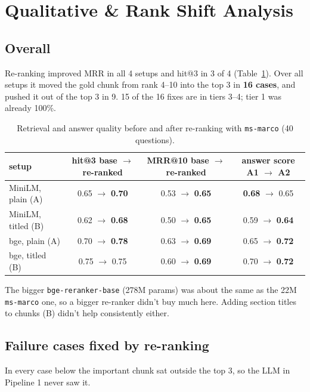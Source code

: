 \documentclass[10pt,a4paper]{article}
\begin{document}
\section{Qualitative \& Rank Shift Analysis}

\subsection{Overall}
Re-ranking improved MRR in all 4 setups and hit@3 in 3 of 4 (Table~\ref{tab:ret}). Over all setups it moved the gold chunk from rank 4--10 into the top 3 in \textbf{16 cases}, and pushed it out of the top 3 in 9. 15 of the 16 fixes are in tiers 3--4; tier 1 was already 100\%.

\begin{table}[H]
\centering\small
{}
\begin{tabular}{@{}lccc@{}}
\toprule
\textbf{setup} & \textbf{hit@3} base $\to$ re-ranked & \textbf{MRR@10} base $\to$ re-ranked & \textbf{answer score} A1 $\to$ A2 \\
\midrule
MiniLM, plain (A)  & 0.65 $\to$ \textbf{0.70} & 0.53 $\to$ \textbf{0.65} & \textbf{0.68} $\to$ 0.65 \\
MiniLM, titled (B) & 0.62 $\to$ \textbf{0.68} & 0.50 $\to$ \textbf{0.65} & 0.59 $\to$ \textbf{0.64} \\
bge, plain (A)     & 0.70 $\to$ \textbf{0.78} & 0.63 $\to$ \textbf{0.69} & 0.65 $\to$ \textbf{0.72} \\
bge, titled (B)    & 0.75 $\to$ 0.75          & 0.60 $\to$ \textbf{0.69} & 0.70 $\to$ \textbf{0.72} \\
\bottomrule
\end{tabular}
\caption{Retrieval and answer quality before and after re-ranking with \texttt{ms-marco} (40 questions).}
\label{tab:ret}
\end{table}

The bigger \texttt{bge-reranker-base} (278M params) was about the same as the 22M \texttt{ms-marco} one, so a bigger re-ranker didn't buy much here. Adding section titles to chunks (B) didn't help consistently either.

\subsection{Failure cases fixed by re-ranking}
In every case below the important chunk sat outside the top 3, so the LLM in Pipeline 1 never saw it.
\end{document}
